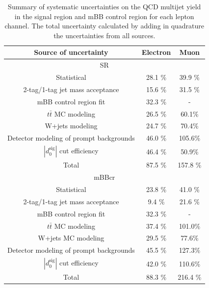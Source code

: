 \begin{table}[!htbp]
\begin{center}
\begin{tabular}{c|c|c}
Source of uncertainty &  Electron  & Muon  \\  
\hline
\multicolumn{3}{c}{SR} \\
\hline
Statistical                                      &  28.1 \% & 39.9 \% \\
2-tag/1-tag jet mass acceptance                  &  15.6 \% & 31.5 \% \\
mBB control region fit                           &  32.3 \% & - \\
$t\bar{t}$ MC modeling                          &  26.5 \% & 60.1\% \\
W+jets modeling                                 &  24.7 \% & 70.4\% \\
Detector modeling of prompt backgrounds         &  46.0 \% & 105.6\% \\
$|d_{0}^{\textrm{sig}}|$ cut efficiency          &  46.4 \% & 50.9\% \\
\hline
Total                                            &  87.5 \% & 157.8 \% \\
\hline
\hline
\multicolumn{3}{c}{mBBcr} \\
\hline
Statistical                                      &  23.8 \% & 41.0 \% \\
2-tag/1-tag jet mass acceptance                  &  9.4  \% & 21.6 \% \\
mBB control region fit                           &  32.3 \% & -       \\
$t\bar{t}$ MC modeling                          &  37.4 \% & 101.0\% \\
W+jets MC modeling                              &  29.5 \% & 77.6\% \\
Detector modeling of prompt backgrounds         &  45.5 \% & 127.3\% \\
$|d_{0}^{\textrm{sig}}|$ cut efficiency          &  42.0 \% & 110.6\% \\
\hline
Total                                            &  88.3 \% & 216.4 \% \\
\end{tabular}
\end{center}
\caption[Summary of systematic uncertainties on the QCD multijet yield in the signal region and mBB control region
for each lepton channel]{Summary of systematic uncertainties on the QCD multijet yield in the signal region and mBB control region
for each lepton channel. The total uncertainty calculated by adding in quadrature the uncertainties from all sources.}
\label{tab:boosted_syst_qcd_norm_unc_final}
\end{table}
 
